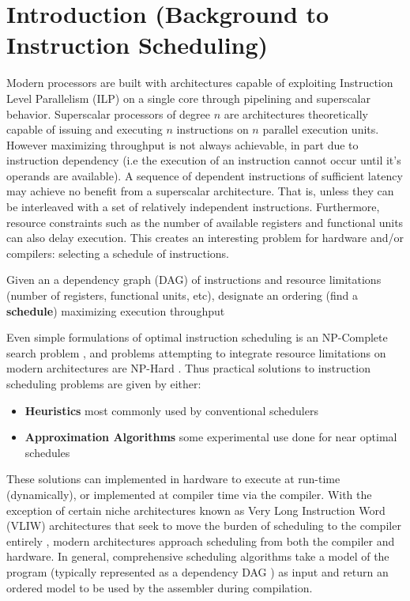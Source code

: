\documentclass[12pt]{report}
\begin{document}
\newpage
\thispagestyle{empty}
\tableofcontents
\newpage

\chapter{Introduction (Background to Instruction Scheduling)}
\label{sec:orge78e466}
Modern processors are built with architectures capable of exploiting
Instruction Level Parallelism (ILP) on a single core 
through pipelining and superscalar behavior. Superscalar
processors of degree \(n\) are architectures theoretically capable of issuing
and executing \(n\) instructions on \(n\) parallel execution units. However
maximizing throughput is not always achievable, in part due to instruction
dependency (i.e the execution of an instruction cannot occur until it's
operands are available). A sequence of dependent instructions of sufficient
latency may achieve no benefit from a superscalar architecture. That is, unless they can be
interleaved with a set of relatively independent instructions. Furthermore,
resource constraints such as the number of available registers and functional
units can also delay execution. This creates an interesting problem for
hardware and/or compilers: selecting a schedule of instructions.
\begin{tcolorbox}[title=Problem: Instruction Scheduling]
Given an a dependency graph (DAG) of instructions and resource limitations
(number of registers, functional units, etc), designate an ordering (find a \textbf{schedule}) 
maximizing execution throughput 
\end{tcolorbox}

Even simple formulations of optimal instruction scheduling is an NP-Complete
search problem \parencite{hennessy1983postpass}, and problems attempting to
integrate resource limitations on modern architectures are NP-Hard
\parencite{motwani1995combining}. Thus practical solutions to instruction
scheduling problems are given by either:
\begin{itemize}
\item \textbf{Heuristics} most commonly used by conventional schedulers
\item \textbf{Approximation Algorithms} some experimental use done for near optimal
schedules \parencite{costa2016approx}
\end{itemize}
These solutions can implemented in hardware to execute at run-time
 (dynamically), or implemented at compiler time via the compiler. With the
 exception of certain niche architectures known as Very Long Instruction Word
 (VLIW) architectures that seek to move the burden of scheduling to the compiler
 entirely \parencite{fisher1983very}, modern architectures approach scheduling
 from both the compiler and hardware. In general, comprehensive scheduling
 algorithms take a model of the program (typically represented as a dependency
 DAG \parencite{gibbons1986efficient}) as input and return an ordered model to
 be used by the assembler during compilation.
\end{document}
